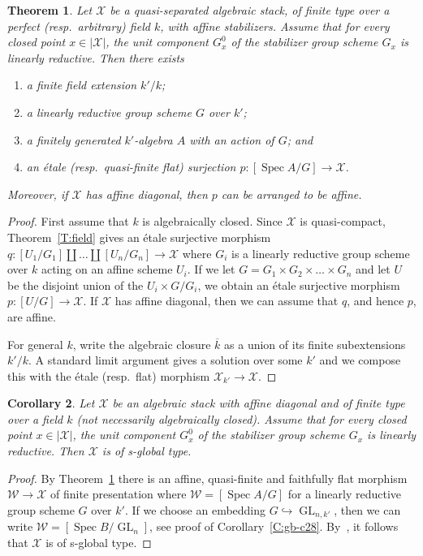 \documentclass[a4paper]{amsart}
\theoremstyle{plain}
\newtheorem{theorem}{Theorem}[section]
\newtheorem{corollary}[theorem]{Corollary}
\theoremstyle{definition}
\theoremstyle{remark}
\numberwithin{equation}{section}
\newcommand{\inj}{\hookrightarrow} %
\newcommand\cW{\mathcal{W}}
\newcommand\cX{\mathcal{X}}
\newcommand\co{\colon}
\DeclareMathOperator{\Spec}{Spec}
\DeclareMathOperator{\GL}{GL}
\begin{document}
\begin{theorem}\label{T:global-type}
Let $\cX$ be a quasi-separated algebraic stack, of finite type over
a perfect (resp.\ arbitrary) field $k$, with
affine stabilizers. Assume that for every closed point $x\in |\cX|$, the unit
component $G_x^0$ of the stabilizer group scheme $G_x$ is linearly reductive.
Then there exists
\begin{enumerate}
\item a finite field extension $k'/k$;
\item a linearly reductive group scheme $G$ over $k'$;
\item a finitely generated $k'$-algebra $A$ with an action of $G$; and
\item an \'etale (resp.\ quasi-finite flat) surjection
  $p\colon [\Spec A/G] \to \cX$.
\end{enumerate}
Moreover, if $\cX$ has affine diagonal, then $p$ can be arranged to be affine.
\end{theorem}
\begin{proof}
First assume that $k$ is algebraically closed. Since $\cX$ is quasi-compact,
Theorem~\ref{T:field} gives an \'etale surjective morphism
$q\co [U_1/G_1]\amalg\dots\amalg [U_n/G_n]\to \cX$ where $G_i$ is a linearly
reductive group scheme over $k$ acting on an affine scheme $U_i$. If we let
$G=G_1\times G_2\times\dots\times G_n$ and let $U$ be the disjoint union of the
$U_i\times G/G_i$, we obtain an \'etale surjective morphism $p\co [U/G]\to \cX$.
If $\cX$ has affine diagonal, then we can assume that $q$, and hence $p$, are
affine.

For general $k$, write the algebraic closure $\overline{k}$ as a union of its
finite subextensions $k'/k$. A standard limit argument gives a solution over
some $k'$ and we compose this with the \'etale (resp.\ flat) morphism
$\cX_{k'}\to \cX$.
\end{proof}

\begin{corollary}\label{C:s-global-type}
Let $\cX$ be an algebraic stack with affine diagonal and of finite type over a
field $k$ (not necessarily algebraically closed). Assume that for every closed
point $x\in |\cX|$, the unit component $G_x^0$ of the stabilizer group scheme
$G_x$ is linearly reductive. Then $\cX$ is of s-global type.
\end{corollary}
\begin{proof}
By Theorem~\ref{T:global-type} there is an affine,
quasi-finite and faithfully flat morphism $\cW\to \cX$ of finite
presentation where $\cW=[\Spec A/G]$ for a linearly reductive group scheme
$G$ over $k'$. If we choose an embedding $G\inj \GL_{n,k'}$, then we can
write $\cW=[\Spec B/\GL_n]$, see proof of Corollary~\ref{C:gb-c28}.
By~\cite[Prop.~2.8~(iii)]{rydh-noetherian}, it follows that $\cX$ is of
s-global type.
\end{proof}
\end{document}
